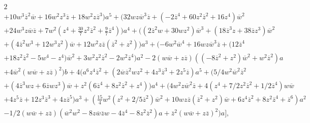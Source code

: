 \documentclass[12pt]{amsart}
\begin{document}
\begin{footnotesize}
\begin{multline*}
{2}\\
+10{w}^{3}{{ \overline{z}}}^{2}{ \overline{w}}+16{w}^{2}{z}^{3}{ \overline{z}}+18{w
}^{2}z{{ \overline{z}}}^{3} ) {a}^{5}+ ( 32wz{{ \overline{w}}}^{3}{ 
\overline{z}}+ ( -2{{ \overline{z}}}^{4}+60{z}^{2}{{ \overline{z}}}^{2}+16{z}^{4}
 ) {{ \overline{w}}}^{2}\\
 +24{w}^{3}z{ \overline{w}}{ \overline{z}}+7{w}^{2}
 ( {z}^{4}+{\frac {30}{7}}{z}^{2}{{ \overline{z}}}^{2}+{\frac {9}{7}}
{{ \overline{z}}}^{4} )  ) {a}^{4}+ (  ( 2{{ \overline{z}}
}^{2}w+30w{z}^{2} ) {{ \overline{w}}}^{3}+ ( 18{{ \overline{z}}}^{3}z
+38{ \overline{z}}{z}^{3} ) {{ \overline{w}}}^{2}\\
+ ( 4{{ \overline{z}}}^{2
}{w}^{3}+12{w}^{3}{z}^{2} ) { \overline{w}}+12{w}^{2}z{ \overline{z}}
 ( {{ \overline{z}}}^{2}+{z}^{2} )  ) {a}^{3}+ ( -6{w
}^{2}{{ \overline{w}}}^{4}+16wz{{ \overline{w}}}^{3}{ \overline{z}}+ ( 12{{ \overline{z}}
}^{4}\\
+18{z}^{2}{{ \overline{z}}}^{2}-5{w}^{4}-{z}^{4} ) {{ \overline{w}}}^
{2}+3{w}^{2}{z}^{2}{{ \overline{z}}}^{2}-2{w}^{2}{{ \overline{z}}}^{4} ) {
a}^{2}-2 ( w{ \overline{w}}+z{ \overline{z}} )  (  ( -8{{
 \overline{z}}}^{2}+{z}^{2} ) {{ \overline{w}}}^{2}+{w}^{2}{{ \overline{z}}}^{2}
 ) a\\
 +4{{ \overline{w}}}^{2} ( w{ \overline{w}}+z{ \overline{z}} ) ^{2}
 ) b+4 ( {a}^{6}{z}^{4}{{ \overline{z}}}^{2}+ ( 2{ \overline{w}}
{{ \overline{z}}}^{2}w{z}^{2}+4{z}^{3}{{ \overline{z}}}^{3}+2{z}^{5}{ \overline{z}}
 ) {a}^{5}+ ( 5/4{w}^{2}{{ \overline{w}}}^{2}{{ \overline{z}}}^{2}\\
 +
 ( 4{{ \overline{z}}}^{3}wz+6{ \overline{z}}w{z}^{3} ) { \overline{w}}+{z}
^{2} ( 6{{ \overline{z}}}^{4}+8{z}^{2}{{ \overline{z}}}^{2}+{z}^{4}
 )  ) {a}^{4}+ ( 4{w}^{2}z{{ \overline{w}}}^{2}{ \overline{z}}+4
 ( {z}^{4}+7/2{z}^{2}{{ \overline{z}}}^{2}+1/2{{ \overline{z}}}^{4}
 ) w{ \overline{w}}\\
 +4{z}^{5}{ \overline{z}}+12{z}^{3}{{ \overline{z}}}^{3}+4z{{
 \overline{z}}}^{5} ) {a}^{3}+ ( {\frac {15}{4}}{w}^{2} ( {
z}^{2}+2/5{{ \overline{z}}}^{2} ) {{ \overline{w}}}^{2}+10wz{ \overline{z}}
 ( {{ \overline{z}}}^{2}+{z}^{2} ) { \overline{w}}+6{z}^{4}{{ \overline{z}}}^{
2}+8{z}^{2}{{ \overline{z}}}^{4}+{{ \overline{z}}}^{6} ) {a}^{2}\\
-1/2
 ( w{ \overline{w}}+z{ \overline{z}} )  ( {{ \overline{w}}}^{2}{w}^{2}-8z
{ \overline{w}}{ \overline{z}}w-4{{ \overline{z}}}^{4}-8{z}^{2}{{ \overline{z}}}^{2}
 ) a+{{ \overline{z}}}^{2} ( w{ \overline{w}}+z{ \overline{z}} ) ^{2}
 ) a \Bigr],
\end{multline*}
\end{footnotesize}
\end{document}
